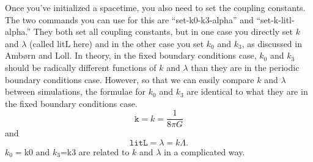 \message{ !name(users_guide.tex)}\documentclass{article}
\begin{document}
Once you've initialized a spacetime, you also need to set the coupling
constants. The two commands you can use for this are
``set-k0-k3-alpha'' and ``set-k-litl-alpha.'' They both set all
coupling constants, but in one case you directly set $k$ and $\lambda$
(called litL here) and in the other case you set $k_0$ and $k_3$, as
discussed in Amb\o rn and Loll. In theory, in the fixed boundary
conditions case, $k_0$ and $k_3$ should be radically different
functions of $k$ and $\lambda$ than they are in the periodic boundary
conditions case. However, so that we can easily compare $k$ and
$\lambda$ between simulations, the formulae for $k_0$ and $k_3$ are
identical to what they are in the fixed boundary conditions case.
$$\texttt{k} = k=\frac{1}{8\pi G}$$
and
$$\texttt{litL} = \lambda = k\Lambda.$$
$k_0=$k0 and $k_3$=k3 are related to $k$ and $\lambda$ in a complicated way.
\end{document}
